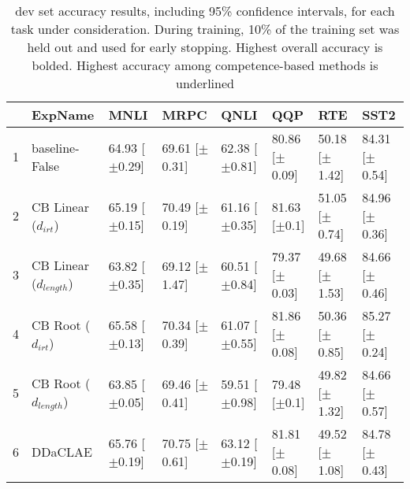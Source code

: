 \begin{table*}[ht]
\centering
\begingroup\small
\begin{tabular}{rlllllll}
  \toprule
 & ExpName & MNLI & MRPC & QNLI & QQP & RTE & SST2 \\ 
  \midrule
1 & baseline-False & 64.93 [$\pm$0.29] & 69.61 [$\pm$0.31] & 62.38 [$\pm$0.81] & 80.86 [$\pm$0.09] & 50.18 [$\pm$1.42] & 84.31 [$\pm$0.54] \\ 
  2 & CB Linear ($d_{irt}$) & 65.19 [$\pm$0.15] & 70.49 [$\pm$0.19] & 61.16 [$\pm$0.35] & 81.63 [$\pm$0.1] & 51.05 [$\pm$0.74] & 84.96 [$\pm$0.36] \\ 
  3 & CB Linear ($d_{length}$) & 63.82 [$\pm$0.35] & 69.12 [$\pm$1.47] & 60.51 [$\pm$0.84] & 79.37 [$\pm$0.03] & 49.68 [$\pm$1.53] & 84.66 [$\pm$0.46] \\ 
  4 & CB Root ($d_{irt}$) & 65.58 [$\pm$0.13] & 70.34 [$\pm$0.39] & 61.07 [$\pm$0.55] & 81.86 [$\pm$0.08] & 50.36 [$\pm$0.85] & 85.27 [$\pm$0.24] \\ 
  5 & CB Root ($d_{length}$) & 63.85 [$\pm$0.05] & 69.46 [$\pm$0.41] & 59.51 [$\pm$0.98] & 79.48 [$\pm$0.1] & 49.82 [$\pm$1.32] & 84.66 [$\pm$0.57] \\ 
  6 & DDaCLAE & 65.76 [$\pm$0.19] & 70.75 [$\pm$0.61] & 63.12 [$\pm$0.19] & 81.81 [$\pm$0.08] & 49.52 [$\pm$1.08] & 84.78 [$\pm$0.43] \\ 
   \bottomrule
\end{tabular}
\endgroup
\caption{dev set accuracy results, including 95\% confidence intervals, for each task under consideration. During training, 10\% of the training set was held out and used for early stopping. Highest overall accuracy is bolded. Highest accuracy among competence-based methods is underlined} 
\label{tab:acc_lstm-False}
\end{table*}
